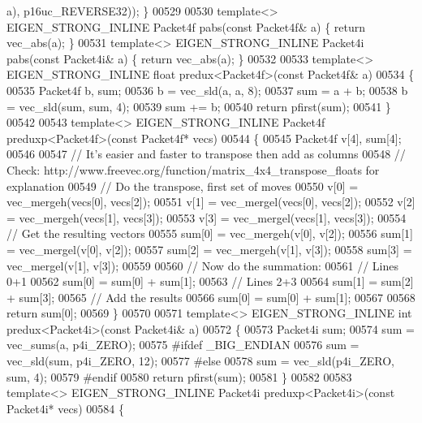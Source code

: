\begin{DoxyCode}
{      a), p16uc\_REVERSE32)); \}
00529 
00530 \textcolor{keyword}{template}<> EIGEN\_STRONG\_INLINE Packet4f pabs(\textcolor{keyword}{const} Packet4f& a) \{ \textcolor{keywordflow}{return} vec\_abs(a); \}
00531 \textcolor{keyword}{template}<> EIGEN\_STRONG\_INLINE Packet4i pabs(\textcolor{keyword}{const} Packet4i& a) \{ \textcolor{keywordflow}{return} vec\_abs(a); \}
00532 
00533 \textcolor{keyword}{template}<> EIGEN\_STRONG\_INLINE \textcolor{keywordtype}{float} predux<Packet4f>(\textcolor{keyword}{const} Packet4f& a)
00534 \{
00535   Packet4f b, sum;
00536   b   = vec\_sld(a, a, 8);
00537   sum = a + b;
00538   b   = vec\_sld(sum, sum, 4);
00539   sum += b;
00540   \textcolor{keywordflow}{return} pfirst(sum);
00541 \}
00542 
00543 \textcolor{keyword}{template}<> EIGEN\_STRONG\_INLINE Packet4f preduxp<Packet4f>(\textcolor{keyword}{const} Packet4f* vecs)
00544 \{
00545   Packet4f v[4], sum[4];
00546 
00547   \textcolor{comment}{// It's easier and faster to transpose then add as columns}
00548   \textcolor{comment}{// Check: http://www.freevec.org/function/matrix\_4x4\_transpose\_floats for explanation}
00549   \textcolor{comment}{// Do the transpose, first set of moves}
00550   v[0] = vec\_mergeh(vecs[0], vecs[2]);
00551   v[1] = vec\_mergel(vecs[0], vecs[2]);
00552   v[2] = vec\_mergeh(vecs[1], vecs[3]);
00553   v[3] = vec\_mergel(vecs[1], vecs[3]);
00554   \textcolor{comment}{// Get the resulting vectors}
00555   sum[0] = vec\_mergeh(v[0], v[2]);
00556   sum[1] = vec\_mergel(v[0], v[2]);
00557   sum[2] = vec\_mergeh(v[1], v[3]);
00558   sum[3] = vec\_mergel(v[1], v[3]);
00559 
00560   \textcolor{comment}{// Now do the summation:}
00561   \textcolor{comment}{// Lines 0+1}
00562   sum[0] = sum[0] + sum[1];
00563   \textcolor{comment}{// Lines 2+3}
00564   sum[1] = sum[2] + sum[3];
00565   \textcolor{comment}{// Add the results}
00566   sum[0] = sum[0] + sum[1];
00567 
00568   \textcolor{keywordflow}{return} sum[0];
00569 \}
00570 
00571 \textcolor{keyword}{template}<> EIGEN\_STRONG\_INLINE \textcolor{keywordtype}{int} predux<Packet4i>(\textcolor{keyword}{const} Packet4i& a)
00572 \{
00573   Packet4i sum;
00574   sum = vec\_sums(a, p4i\_ZERO);
00575 \textcolor{preprocessor}{#ifdef \_BIG\_ENDIAN}
00576   sum = vec\_sld(sum, p4i\_ZERO, 12);
00577 \textcolor{preprocessor}{#else}
00578   sum = vec\_sld(p4i\_ZERO, sum, 4);
00579 \textcolor{preprocessor}{#endif}
00580   \textcolor{keywordflow}{return} pfirst(sum);
00581 \}
00582 
00583 \textcolor{keyword}{template}<> EIGEN\_STRONG\_INLINE Packet4i preduxp<Packet4i>(\textcolor{keyword}{const} Packet4i* vecs)
00584 \{
}
\end{DoxyCode}
